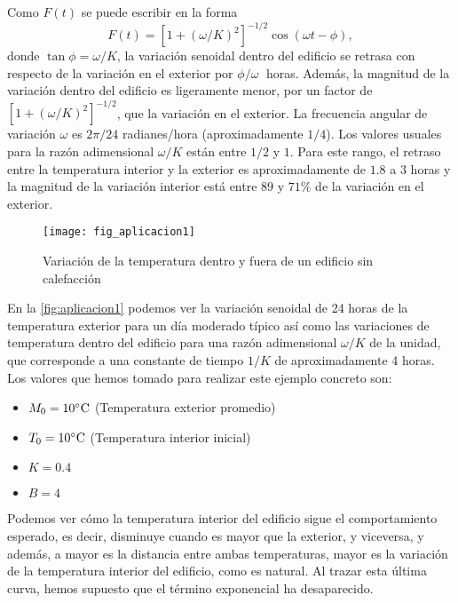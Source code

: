 \begin{ejemplo}
	Como $F(t)$ se puede escribir en la forma
	\begin{equation}
		F(t) = [1 + (\omega /K)^2]^{-1/2}\cos (\omega t - \phi),
	\end{equation}
	donde $\tan \phi = \omega /K$, la variación senoidal dentro del edificio se retrasa con respecto de la variación en el exterior por $\phi / \omega$ horas. Además, la magnitud de la variación dentro del edificio es ligeramente menor, por un factor de $[1 + (\omega /K)^2]^{-1/2}$, que la variación en el exterior. La frecuencia angular de variación $\omega$ es $2 \pi / 24$ radianes/hora (aproximadamente $1/4$). Los valores usuales para la razón adimensional $\omega /K$ están entre $1/2$ y $1$. Para este rango, el retraso entre la temperatura interior y la exterior es aproximadamente de $1.8$ a $3$ horas y la magnitud de la variación interior está entre $89$ y $71\%$ de la variación en el exterior.
	\begin{figure}[h!]
		\centering
		\texttt{[image: fig\_aplicacion1]}
		\caption{Variación de la temperatura dentro y fuera de un edificio sin calefacción}
		\label{fig:aplicacion1}
	\end{figure}
	En la \autoref{fig:aplicacion1} podemos ver la variación senoidal de 24 horas de la temperatura exterior para un día moderado típico así como las variaciones de temperatura dentro del edificio para una razón adimensional $\omega /K$ de la unidad, que corresponde a una constante de tiempo $1/K$ de aproximadamente 4 horas. Los valores que hemos tomado para realizar este ejemplo concreto son:
	\begin{itemize}
		\item $M_0 = 10\celsius$ (Temperatura exterior promedio)
		\item $T_0 = 10\celsius$ (Temperatura interior inicial)
		\item $K = 0.4$
		\item $B = 4$
	\end{itemize}
	Podemos ver cómo la temperatura interior del edificio sigue el comportamiento esperado, es decir, disminuye cuando es mayor que la exterior, y viceversa, y además, a mayor es la distancia entre ambas temperaturas, mayor es la variación de la temperatura interior del edificio, como es natural.
	Al trazar esta última curva, hemos supuesto que el término exponencial ha desaparecido.
\end{ejemplo}
